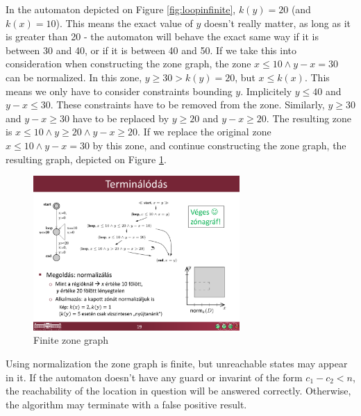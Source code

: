 \begin{example}
In the automaton depicted on Figure \ref{fig:loopinfinite}, $k(y)=20$ (and $k(x)=10$). This means the exact value of $y$ doesn't really matter, as long as it is greater than 20 - the automaton will behave the exact same way if it is between 30 and 40, or if it is between 40 and 50. %
If we take this into consideration when constructing the zone graph, the zone  $x \leq 10 \wedge y-x=30$ can be normalized. In this zone, $y \geq 30 > k(y)=20$, but $x \leq k(x)$. This means we only have to consider constraints bounding $y$.
Implicitely $y \leq 40$ and $y-x \leq 30$. These constraints have to be removed from the zone. Similarly, $y \geq 30$ and $y-x \geq 30$ have to be replaced by $y \geq 20$ and $y-x \geq 20$. The resulting zone is $x \leq 10 \wedge y \geq 20 \wedge y-x \geq 20$. If we replace the original zone  $x \leq 10 \wedge y-x=30$ by this zone, and continue constructing the zone graph, the resulting graph, depicted on Figure \ref{fig:looprealgraph}.

\end{example}

\begin{figure}
	\centering
	\includegraphics [width=0.7\textwidth] {include/figures/loop_real_zonegraph}%
	\caption{Finite zone graph}
	\label{fig:looprealgraph}
\end{figure}

Using normalization the zone graph is finite, but unreachable states may appear in it. If the automaton doesn't have any guard or invarint of the form $c_1 - c_2 < n$, the reachability of the location in question will be answered correctly. Otherwise, the algorithm may terminate with a false positive result.

